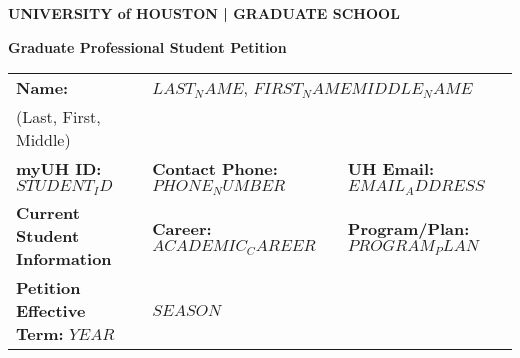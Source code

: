 \documentclass[12pt]{article}
\newcommand{\lastName}{$LAST_NAME$}
\newcommand{\firstName}{$FIRST_NAME$}
\newcommand{\middleName}{$MIDDLE_NAME$}
\newcommand{\studentID}{$STUDENT_ID$}
\newcommand{\phoneNumber}{$PHONE_NUMBER$}
\newcommand{\emailAddress}{$EMAIL_ADDRESS$}
\newcommand{\programPlan}{$PROGRAM_PLAN$}
\newcommand{\academicCareer}{$ACADEMIC_CAREER$}
\newcommand{\yearValue}{$YEAR$}
\newcommand{\seasonValue}{$SEASON$}
\begin{document}
\thispagestyle{empty}

\begin{center}
  \textbf{\huge \color{gray} UNIVERSITY of \color{red} HOUSTON \color{darkgray} | GRADUATE SCHOOL}
\end{center}

\textbf{\LARGE Graduate Professional Student Petition} 
\vspace{1.5em}

\begin{tabular}{|p{}|p{}|p{}|}
\hline
\textbf{Name:} & \multicolumn{2}{l|}{\lastName, \firstName \middleName} \\
\scriptsize (Last, First, Middle) & \multicolumn{2}{l|}{} \\
\hline
\textbf{myUH ID:} \studentID & \textbf{Contact Phone:} \phoneNumber & \textbf{UH Email:} \emailAddress \\
\hline
\textbf{Current Student Information} & \textbf{Career:} \academicCareer & \textbf{Program/Plan:} \programPlan \\
\hline
\textbf{Petition Effective Term:} \yearValue & \multicolumn{2}{l|}{\seasonValue} \\
\hline
\end{tabular}
\vspace{0.5em}
\end{document}
